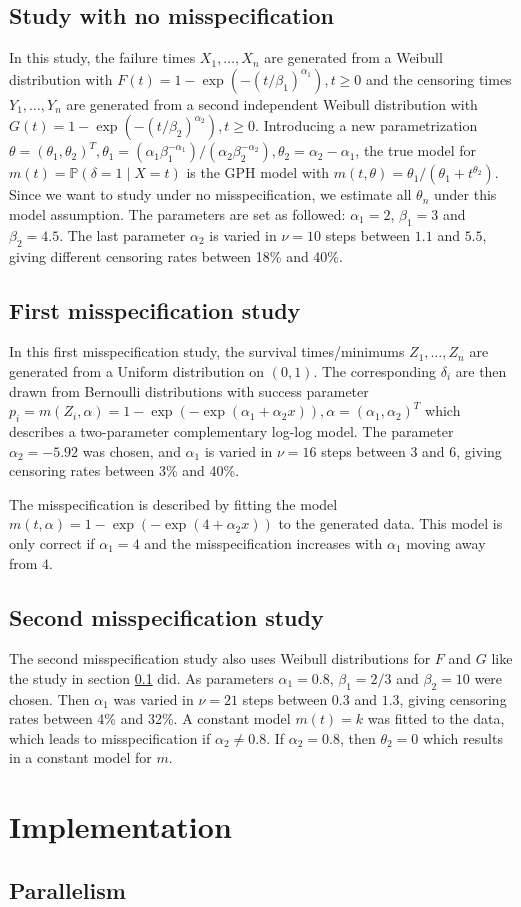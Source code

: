 \subsection{Study with no misspecification}\label{study1}
In this study, the failure times $X_1,\ldots,X_n$ are generated from a Weibull distribution with $F(t) = 1 - \exp(-(t/\beta_1)^{\alpha_1}), t \geq 0$ and the censoring times $Y_1,\ldots,Y_n$ are generated from a second independent Weibull distribution with $G(t) = 1 - \exp(-(t/\beta_2)^{\alpha_2}), t \geq 0$.
Introducing a new parametrization $\theta = (\theta_1, \theta_2)^T, \theta_1 = (\alpha_1\beta_1^{-\alpha_1})/(\alpha_2\beta_2^{-\alpha_2}), \theta_2 = \alpha_2-\alpha_1$, the true model for $m(t)=\mathbb{P}(\delta=1\mid X=t)$ is the GPH model with $m(t,\theta) = \theta_1/(\theta_1+t^{\theta_2})$. Since we want to study under no misspecification, we estimate all $\theta_n$ under this model assumption.
The parameters are set as followed: $\alpha_1=2$, $\beta_1=3$ and $\beta_2=4.5$. The last parameter $\alpha_2$ is varied in $\nu = 10$ steps between $1.1$ and $5.5$, giving different censoring rates between 18\% and 40\%.

\subsection{First misspecification study}\label{study2}
In this first misspecification study, the survival times/minimums $Z_1,\ldots,Z_n$ are generated from a Uniform distribution on $(0,1)$. The corresponding $\delta_i$ are then drawn from Bernoulli distributions with success parameter $p_i = m(Z_i,\alpha) = 1-\exp(-\exp(\alpha_1+\alpha_2x)), \alpha = (\alpha_1, \alpha_2)^T$ which describes a two-parameter complementary log-log model. The parameter $\alpha_2 = -5.92$ was chosen, and $\alpha_1$ is varied in $\nu = 16$ steps between $3$ and $6$, giving censoring rates between 3\% and 40\%.

The misspecification is described by fitting the model $m(t,\alpha) = 1-\exp(-\exp(4+\alpha_2x))$ to the generated data. This model is only correct if $\alpha_1 = 4$ and the misspecification increases with $\alpha_1$ moving away from $4$.

\subsection{Second misspecification study}\label{study3}
The second misspecification study also uses Weibull distributions for $F$ and $G$ like the study in section \ref{study1} did. As parameters $\alpha_1 = 0.8$, $\beta_1=2/3$ and $\beta_2=10$ were chosen. Then $\alpha_1$ was varied in $\nu = 21$ steps between $0.3$ and $1.3$, giving censoring rates between 4\% and 32\%. 
A constant model $m(t) = k$ was fitted to the data, which leads to misspecification if $\alpha_2 \neq 0.8$. If $\alpha_2 = 0.8$, then $\theta_2 = 0$ which results in a constant model for $m$.


\section{Implementation}

\subsection{Parallelism}